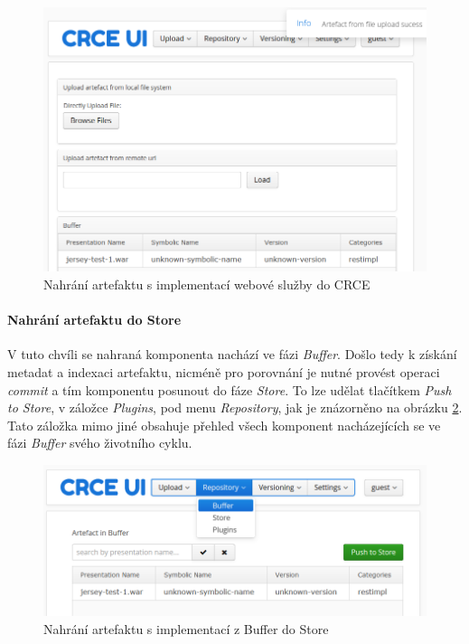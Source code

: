 \documentclass[czech,DP]{thesiskiv}
\begin{document}
\begin{figure}[h]
	\centering
	\includegraphics[width=\linewidth]{crce-art-upload.png}
	\caption{Nahrání artefaktu s implementací webové služby do CRCE}
	\label{fig:crce-art-upload}
\end{figure}

\paragraph{Nahrání artefaktu do Store}
V tuto chvíli se nahraná komponenta nachází ve fázi \textit{Buffer}. Došlo tedy k získání metadat a indexaci artefaktu, nicméně pro porovnání je nutné provést operaci \textit{commit} a tím komponentu posunout do fáze \textit{Store}. To lze udělat tlačítkem \textit{Push to Store}, v záložce \textit{Plugins}, pod menu \textit{Repository}, jak je znázorněno na obrázku \ref{fig:crce-art-push-to-store}. Tato záložka mimo jiné obsahuje přehled všech komponent nacházejících se ve fázi \textit{Buffer} svého životního cyklu.

\begin{figure}[h]
	\centering
	\includegraphics[width=\linewidth]{crce-art-push-to-store.png}
	\caption{Nahrání artefaktu s implementací z Buffer do Store}
	\label{fig:crce-art-push-to-store}
\end{figure}
\end{document}
